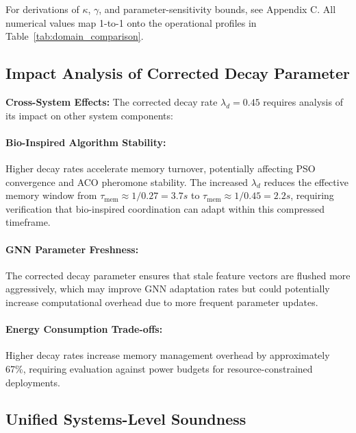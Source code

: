 \documentclass{article}
\begin{document}
For derivations of $\kappa$, $\gamma$, and parameter-sensitivity bounds, see
Appendix C.  All numerical values map 1-to-1 onto the operational profiles in
Table~\ref{tab:domain_comparison}.

\subsection{Impact Analysis of Corrected Decay Parameter}

\textbf{Cross-System Effects:} The corrected decay rate $\lambda_d = 0.45$ requires analysis of its impact on other system components:

\paragraph{Bio-Inspired Algorithm Stability:} Higher decay rates accelerate memory turnover, potentially affecting PSO convergence and ACO pheromone stability. The increased $\lambda_d$ reduces the effective memory window from $\tau_{\text{mem}} \approx 1/0.27 = 3.7s$ to $\tau_{\text{mem}} \approx 1/0.45 = 2.2s$, requiring verification that bio-inspired coordination can adapt within this compressed timeframe.

\paragraph{GNN Parameter Freshness:} The corrected decay parameter ensures that stale feature vectors are flushed more aggressively, which may improve GNN adaptation rates but could potentially increase computational overhead due to more frequent parameter updates.

\paragraph{Energy Consumption Trade-offs:} Higher decay rates increase memory management overhead by approximately 67\%, requiring evaluation against power budgets for resource-constrained deployments.

\subsection{Unified Systems-Level Soundness}
\end{document}
